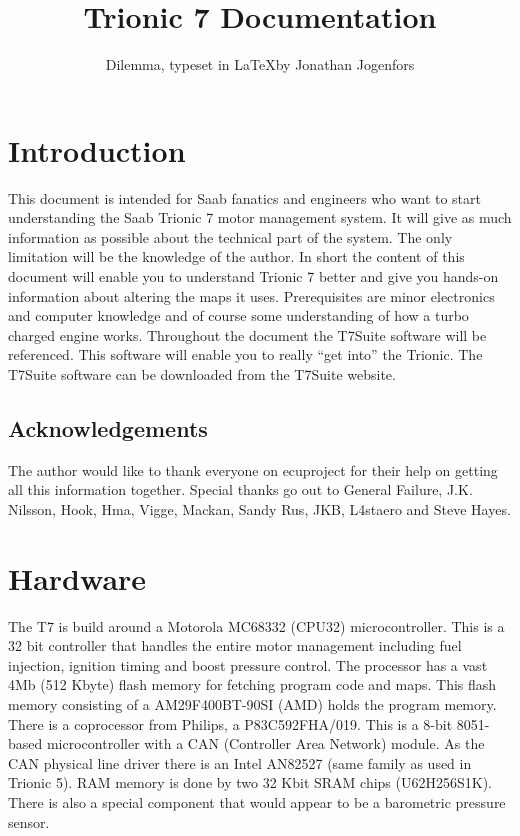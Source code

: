\documentclass[11pt,a4paper]{book}
\begin{document}
\title{Trionic 7 Documentation}
\author{Dilemma, typeset in \LaTeX by Jonathan Jogenfors}

\maketitle
\clearpage
\chapter{Introduction}
This document is intended for Saab fanatics and engineers who want to start
understanding the Saab Trionic 7 motor management system. It will give as much
information as possible about the technical part of the system. The only
limitation will be the knowledge of the author. In short the content of this
document will enable you to understand Trionic 7 better and give you hands-on
information about altering the maps it uses. Prerequisites are minor electronics
and computer knowledge and of course some understanding of how a turbo charged
engine works. Throughout the document the T7Suite software will be referenced.
This software will enable you to really “get into” the Trionic. The T7Suite
software can be downloaded from the T7Suite website.

\section{Acknowledgements}
The author would like to thank everyone on ecuproject for their help on getting
all this information together. Special thanks go out to General Failure, J.K.
Nilsson, Hook, Hma, Vigge, Mackan, Sandy Rus, JKB, L4staero and Steve Hayes.

\tableofcontents

\chapter{Hardware}
The T7 is build around a Motorola MC68332 (CPU32) microcontroller. This is a 32
bit controller that handles the entire motor management including fuel
injection, ignition timing and boost pressure control. The processor has a vast
4Mb (512 Kbyte) flash memory for fetching program code and maps. This flash
memory consisting of a AM29F400BT-90SI (AMD) holds the program memory. There is
a coprocessor from Philips, a P83C592FHA/019. This is a 8-bit 8051-based
microcontroller with a CAN (Controller Area Network) module. As the CAN physical
line driver there is an Intel AN82527 (same family as used in Trionic 5). RAM
memory is done by two 32 Kbit SRAM chips (U62H256S1K). There is also a special
component that would appear to be a barometric pressure sensor.
\end{document}

